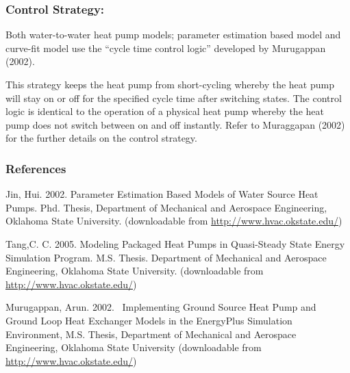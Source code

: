 \subsubsection{Control Strategy:}\label{control-strategy}

Both water-to-water heat pump models; parameter estimation based model and curve-fit model use the ``cycle time control logic'' developed by Murugappan (2002).

This strategy keeps the heat pump from short-cycling whereby the heat pump will stay on or off for the specified cycle time after switching states. The control logic is identical to the operation of a physical heat pump whereby the heat pump does not switch between on and off instantly. Refer to Muraggapan (2002) for the further details on the control strategy.

\subsubsection{References}\label{references-1}

Jin, Hui. 2002. Parameter Estimation Based Models of Water Source Heat Pumps. Phd. Thesis, Department of Mechanical and Aerospace Engineering, Oklahoma State University. (downloadable from \href{http://www.hvac.okstate.edu}{http://www.hvac.okstate.edu/})

Tang,C. C. 2005. Modeling Packaged Heat Pumps in Quasi-Steady State Energy Simulation Program. M.S. Thesis. Department of Mechanical and Aerospace Engineering, Oklahoma State University. (downloadable from \href{http://www.hvac.okstate.edu}{http://www.hvac.okstate.edu/})

Murugappan, Arun. 2002.~ Implementing Ground Source Heat Pump and Ground Loop Heat Exchanger Models in the EnergyPlus Simulation Environment, M.S. Thesis, Department of Mechanical and Aerospace Engineering, Oklahoma State University (downloadable from \href{http://www.hvac.okstate.edu}{http://www.hvac.okstate.edu/})
